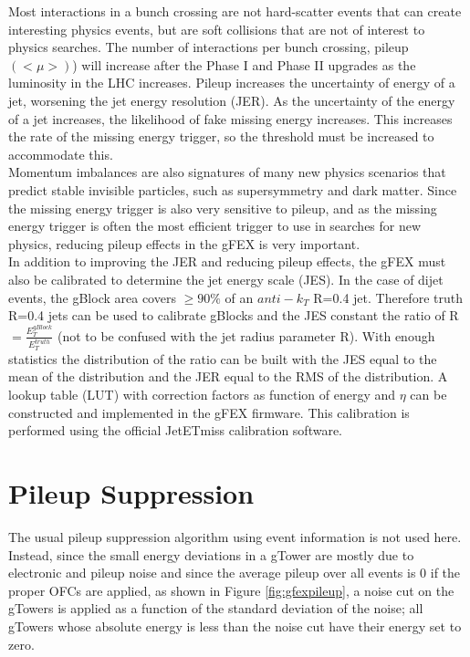 Most interactions in a bunch crossing are not hard-scatter events that can create interesting physics events, but are soft collisions that are not of interest to physics searches.  The number of interactions per bunch crossing, pileup $(<\mu>)$) will increase after the Phase I and Phase II upgrades as the luminosity in the LHC increases.  Pileup increases the uncertainty of energy of a jet, worsening the jet energy resolution (JER).  As the uncertainty of the energy of a jet increases, the likelihood of fake missing energy increases.  This increases the rate of the missing energy trigger, so the threshold must be increased to accommodate this. \\

Momentum imbalances are also signatures of many new physics scenarios that predict stable invisible particles, such as supersymmetry and dark matter.  Since the missing energy trigger is also very sensitive to pileup, and as the missing energy trigger is often the most efficient trigger to use in searches for new physics, reducing pileup effects in the gFEX is very important. \\

In addition to improving the JER and reducing pileup effects, the gFEX must also be calibrated to determine the jet energy scale (JES).  In the case of dijet events, the gBlock area covers $\geq 90\% $ of an $anti-k_{T}$ R=0.4 jet.  Therefore truth R=0.4 jets can be used to calibrate gBlocks and the JES constant the ratio of R$=\frac{E_{T}^{gBlock}}{E_{T}^{truth}}$ (not to be confused with the jet radius parameter R).  With enough statistics the distribution of the ratio can be built with the JES equal to the mean of the distribution and the JER equal to the RMS of the distribution.  A lookup table (LUT) with correction factors as function of energy and $\eta$ can be constructed and implemented in the gFEX firmware.  This calibration is performed using the official JetETmiss calibration software.  \\

\section{Pileup Suppression}

The usual pileup suppression algorithm using event information is not used here.  Instead, since the small energy deviations in a gTower are mostly due to electronic and pileup noise and since the average pileup over all events is 0 if the proper OFCs are applied, as shown in Figure \ref{fig:gfexpileup}, a noise cut on the gTowers is applied as a function of the standard deviation of the noise; all gTowers whose absolute energy is less than the noise cut have their energy set to zero.

